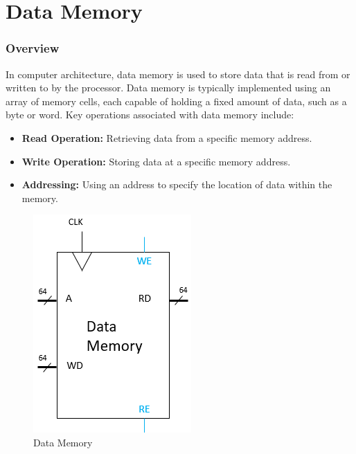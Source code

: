 \section{Data Memory}
\subsubsection{Overview}
In computer architecture, data memory is used to store data that is read from or written to by the processor. Data memory is typically implemented using an array of memory cells, each capable of holding a fixed amount of data, such as a byte or word. Key operations associated with data memory include:

\begin{itemize}
\item \textbf{Read Operation:} Retrieving data from a specific memory address.

\item \textbf{Write Operation:} Storing data at a specific memory address.

\item \textbf{Addressing:} Using an address to specify the location of data within the memory.
 \end{itemize}

 
\begin{figure}[H]
    \centering
    \includegraphics[width=0.3\linewidth]{Image/Data Memory.png}
    \caption{Data Memory}
    \label{fig:enter-label}
\end{figure}

